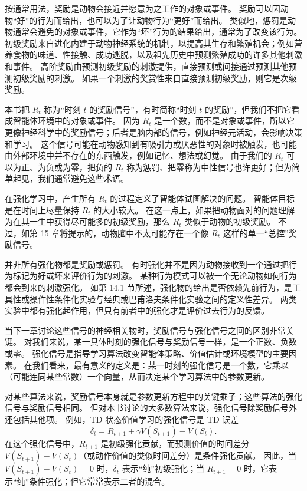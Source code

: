 \documentclass[UTF8,12pt,a4paper,fontset=fandol]{ctexart}
\begin{document}
按通常用法，奖励是动物会接近并愿意为之工作的对象或事件。
奖励可以因动物“好”的行为而给出，也可以为了让动物行为“更好”而给出。
类似地，惩罚是动物通常会避免的对象或事件，它作为“坏”行为的结果给出，通常为了改变该行为。
初级奖励来自进化内建于动物神经系统的机制，以提高其生存和繁殖机会；例如营养食物的味道、性接触、成功逃脱，以及祖先历史中预测繁殖成功的许多其他刺激和事件。
高阶奖励由预测初级奖励的刺激提供，直接预测或间接通过预测其他预测初级奖励的刺激。
如果一个刺激的奖赏性来自直接预测初级奖励，则它是次级奖励。

本书把 $R_t$ 称为“时刻 $t$ 的奖励信号”，有时简称“时刻 $t$ 的奖励”，但我们不把它看成智能体环境中的对象或事件。
因为 $R_t$ 是一个数，而不是对象或事件，所以它更像神经科学中的奖励信号；后者是脑内部的信号，例如神经元活动，会影响决策和学习。
这个信号可能在动物感知到有吸引力或厌恶性的对象时被触发，也可能由外部环境中并不存在的东西触发，例如记忆、想法或幻觉。
由于我们的 $R_t$ 可以为正、为负或为零，把负的 $R_t$ 称为惩罚、把零称为中性信号也许更好；但为简单起见，我们通常避免这些术语。

在强化学习中，产生所有 $R_t$ 的过程定义了智能体试图解决的问题。
智能体目标是在时间上尽量保持 $R_t$ 的大小较大。
在这一点上，如果把动物面对的问题理解为在其一生中获得尽可能多的初级奖励，那么 $R_t$ 类似于动物的初级奖励。
不过，如第 15 章将提示的，动物脑中不太可能存在一个像 $R_t$ 这样的单一“总控”奖励信号。

并非所有强化物都是奖励或惩罚。
有时强化并不是因为动物接收到一个通过把行为标记为好或坏来评价行为的刺激。
某种行为模式可以被一个无论动物如何行为都会到来的刺激强化。
如第 14.1 节所述，强化物的给出是否依赖先前行为，是工具性或操作性条件化实验与经典或巴甫洛夫条件化实验之间的定义性差异。
两类实验中都有强化起作用，但只有前者中的强化才是评价过去行为的反馈。

当下一章讨论这些信号的神经相关物时，奖励信号与强化信号之间的区别非常关键。
对我们来说，某一具体时刻的强化信号与奖励信号一样，是一个正数、负数或零。
强化信号是指导学习算法改变智能体策略、价值估计或环境模型的主要因素。
在我们看来，最有意义的定义是：某一时刻的强化信号是一个数，它乘以（可能连同某些常数）一个向量，从而决定某个学习算法中的参数更新。

对某些算法来说，奖励信号本身就是参数更新方程中的关键乘子；这些算法的强化信号与奖励信号相同。
但对本书讨论的大多数算法来说，强化信号除奖励信号外还包括其他项。
例如，TD 状态价值学习的强化信号是 TD 误差
\[
\delta_t=R_{t+1}+\gamma V(S_{t+1})-V(S_t).
\]
在这个强化信号中，$R_{t+1}$ 是初级强化贡献，而预测价值的时间差分 $V(S_{t+1})-V(S_t)$（或动作价值的类似时间差分）是条件强化贡献。
因此，当 $V(S_{t+1})-V(S_t)=0$ 时，$\delta_t$ 表示“纯”初级强化；当 $R_{t+1}=0$ 时，它表示“纯”条件强化；但它常常表示二者的混合。
\end{document}
